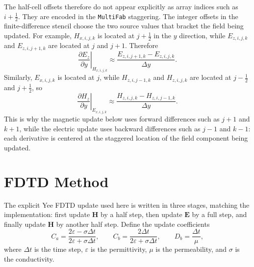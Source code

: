 \documentclass{article}
\numberwithin{equation}{section}
\numberwithin{figure}{section}
\begin{document}
The half-cell offsets therefore do not appear explicitly as array indices such as $i+\frac{1}{2}$. They are encoded in the \texttt{MultiFab} staggering. The integer offsets in the finite-difference stencil choose the two source values that bracket the field being updated. For example, $H_{x,i,j,k}$ is located at $j+\frac{1}{2}$ in the $y$ direction, while $E_{z,i,j,k}$ and $E_{z,i,j+1,k}$ are located at $j$ and $j+1$. Therefore
\begin{equation}
    \left.\frac{\partial E_z}{\partial y}\right|_{H_{x,i,j,k}} \approx \frac{E_{z,i,j+1,k}-E_{z,i,j,k}}{\Delta y}.
\end{equation}
Similarly, $E_{x,i,j,k}$ is located at $j$, while $H_{z,i,j-1,k}$ and $H_{z,i,j,k}$ are located at $j-\frac{1}{2}$ and $j+\frac{1}{2}$, so
\begin{equation}
    \left.\frac{\partial H_z}{\partial y}\right|_{E_{x,i,j,k}} \approx \frac{H_{z,i,j,k}-H_{z,i,j-1,k}}{\Delta y}.
\end{equation}
This is why the magnetic update below uses forward differences such as $j+1$ and $k+1$, while the electric update uses backward differences such as $j-1$ and $k-1$: each derivative is centered at the staggered location of the field component being updated.

\section{FDTD Method}

The explicit Yee FDTD update used here is written in three stages, matching the implementation: first update $\mathbf{H}$ by a half step, then update $\mathbf{E}$ by a full step, and finally update $\mathbf{H}$ by another half step. Define the update coefficients
\begin{equation}\label{eq:fdtd-coefficients}
    C_a = \frac{2\varepsilon - \sigma \Delta t}{2\varepsilon + \sigma \Delta t}, \qquad C_b = \frac{2\Delta t}{2\varepsilon + \sigma \Delta t}, \qquad D_b = \frac{\Delta t}{\mu},
\end{equation}
where $\Delta t$ is the time step, $\varepsilon$ is the permittivity, $\mu$ is the permeability, and $\sigma$ is the conductivity.
\end{document}

